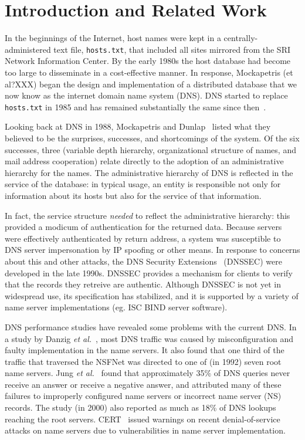 \section{Introduction and Related Work}

In the beginnings of the Internet, host names were kept
in a centrally-administered text file, {\tt hosts.txt}, that
included all sites mirrored from the SRI Network Information Center.
By the early 1980s the host database had become too large
to disseminate in a cost-effective manner.
In response, Mockapetris (et al?XXX) began the design and
implementation of a distributed database that we now know
as the internet domain name system (DNS).
DNS started to replace {\tt hosts.txt} in 1985 and has remained
substantially the same since then~\cite{dns-concept:rfc, dns}.

Looking back at DNS in 1988, Mockapetris and Dunlap~\cite{dns}
listed what they believed to be the surprises, successes,
and shortcomings of the system.  Of the six successes,
three (variable depth hierarchy, organizational structure
of names, and mail address cooperation) relate directly 
to the adoption of an administrative hierarchy for the names.
The administrative hierarchy of DNS is reflected in the 
service of the database: in typical usage, an
entity is responsible not only for information about its hosts
but also for the service of that information.

In fact, the service structure {\em needed} to reflect the 
administrative hierarchy: this provided a modicum of authentication
for the returned data.
Because servers were effectively authenticated by return address,
a system was susceptible to DNS server impersonation by 
IP spoofing or other means.
In response to concerns about this and
other attacks, the DNS Security Extensions~\cite{dnssec:rfc}
 (DNSSEC) were developed in the late 1990s.
DNSSEC provides a mechanism for clients to verify that the
records they retreive are authentic.
Although DNSSEC is not yet in widespread use, its specification
has stabilized, and it is supported by a variety of name server
implementations (eg. ISC BIND server software). 

DNS performance studies have revealed some problems with the
current DNS. In a study by Danzig {\it et al.}~\cite{dnsroot:sigcomm92},
most DNS traffic was caused by misconfiguration and faulty implementation
in the name servers. It also found that one third of the 
traffic that traversed the NSFNet was directed to one of 
(in 1992) seven root name servers. 
Jung {\it et al.}~\cite{dnscache:sigcommimw01}
found that approximately 35\% of DNS queries never receive
an answer or receive a negative answer, and attributed
many of these failures to 
improperly configured name servers or incorrect name server (NS) records.
The study (in 2000) also reported as much as 18\% of DNS lookups 
reaching the root servers. 
CERT~\cite{cert} issued warnings on recent 
denial-of-service attacks on name 
servers due to vulnerabilities in name server implementation.

